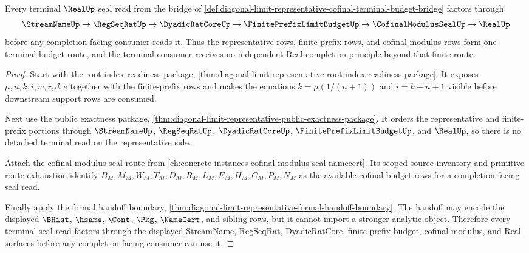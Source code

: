 \begin{theorem}
\label{thm:diagonal-limit-representative-cofinal-budget-seal-totality}
Every terminal $\RealUp$ seal read from the bridge of \autoref{def:diagonal-limit-representative-cofinal-terminal-budget-bridge} factors through
$$
\StreamNameUp \to \RegSeqRatUp \to \DyadicRatCoreUp \to \FinitePrefixLimitBudgetUp \to \CofinalModulusSealUp \to \RealUp
$$
before any completion-facing consumer reads it. Thus the representative rows, finite-prefix rows, and cofinal modulus rows form one terminal budget route, and the terminal consumer receives no independent Real-completion principle beyond that finite route.
\end{theorem}
\begin{proof}
Start with the root-index readiness package, \autoref{thm:diagonal-limit-representative-root-index-readiness-package}. It exposes $\mu,n,k,i,w,r,d,e$ together with the finite-prefix rows and makes the equations $k=\mu(1/(n+1))$ and $i=k+n+1$ visible before downstream support rows are consumed.

Next use the public exactness package, \autoref{thm:diagonal-limit-representative-public-exactness-package}. It orders the representative and finite-prefix portions through $\StreamNameUp$, $\RegSeqRatUp$, $\DyadicRatCoreUp$, $\FinitePrefixLimitBudgetUp$, and $\RealUp$, so there is no detached terminal read on the representative side.

Attach the cofinal modulus seal route from \autoref{ch:concrete-instances-cofinal-modulus-seal-namecert}. Its scoped source inventory and primitive route exhaustion identify $B_M,M_M,W_M,T_M,D_M,R_M,L_M,E_M,H_M,C_M,P_M,N_M$ as the available cofinal budget rows for a completion-facing seal read.

Finally apply the formal handoff boundary, \autoref{thm:diagonal-limit-representative-formal-handoff-boundary}. The handoff may encode the displayed $\BHist$, $\hsame$, $\Cont$, $\Pkg$, $\NameCert$, and sibling rows, but it cannot import a stronger analytic object. Therefore every terminal seal read factors through the displayed StreamName, RegSeqRat, DyadicRatCore, finite-prefix budget, cofinal modulus, and Real surfaces before any completion-facing consumer can use it.
\end{proof}

